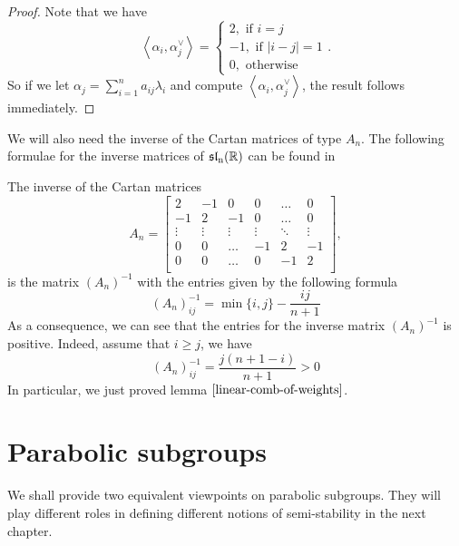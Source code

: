 \begin{proof}
    Note that we have
    \[\left\langle \alpha_i,\alpha_j^{\vee}\right\rangle = \begin{cases}
            2, \mbox{ if } i =j     \\
            -1, \mbox{ if } |i-j|=1 \\
            0, \mbox{ otherwise }
        \end{cases}. \]
    So if we let $\alpha_j = \sum_{i=1}^n a_{ij}\lambda_i$ and compute $\left\langle \alpha_i,\alpha_j^{\vee}\right\rangle$, the result follows immediately.
\end{proof}
We will also need the inverse of the Cartan matrices of type $A_n$. The following formulae for the
inverse matrices of $\operatorname{\mathfrak{sl}_n(\mathbb{R})}$ can be found in \cite{}
\begin{theorem}\label{cartaininverse}
    The inverse of the Cartan matrices
    \[A_n = \begin{bmatrix}
            2      & -1     & 0      & 0      & \ldots & 0      \\
            -1     & 2      & -1     & 0      & \ldots & 0      \\
            \vdots & \vdots & \vdots & \vdots & \ddots & \vdots \\
            0      & 0      & \ldots & -1     & 2      & -1     \\
            0      & 0      & \ldots & 0      & -1     & 2      \\
        \end{bmatrix},\]
    is the matrix $(A_n)^{-1}$ with the entries given by the following formula
    \[(A_n)^{-1}_{ij} = \min\{i,j\}-\dfrac{ij}{n+1}\]
    As a consequence, we can see that the entries for the inverse matrix $(A_n)^{-1}$ is positive. Indeed, assume that
    $i \ge j$, we have
    \[(A_n)^{-1}_{ij} = \dfrac{j(n+1-i)}{n+1}>0\]
    In particular, we just proved lemma $\ref{linear-comb-of-weights}$.
\end{theorem}
\section{Parabolic subgroups}
We shall provide two equivalent viewpoints on parabolic subgroups. They will play different roles in defining
different notions of semi-stability in the next chapter.
